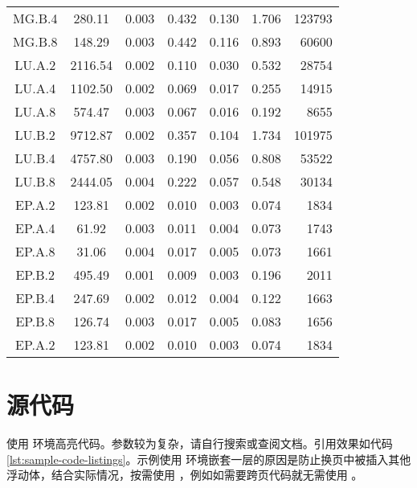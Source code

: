 \begin{longtable}[c]{ccccclr}
  MG.B.4 & 280.11 & 0.003 & 0.432 & 0.130 & 1.706 & 123793 \\
  MG.B.8 & 148.29 & 0.003 & 0.442 & 0.116 & 0.893 & 60600 \\
  LU.A.2 & 2116.54 & 0.002 & 0.110 & 0.030 & 0.532 & 28754 \\
  LU.A.4 & 1102.50 & 0.002 & 0.069 & 0.017 & 0.255 & 14915 \\
  LU.A.8 & 574.47 & 0.003 & 0.067 & 0.016 & 0.192 & 8655 \\
  LU.B.2 & 9712.87 & 0.002 & 0.357 & 0.104 & 1.734 & 101975 \\
  LU.B.4 & 4757.80 & 0.003 & 0.190 & 0.056 & 0.808 & 53522 \\
  LU.B.8 & 2444.05 & 0.004 & 0.222 & 0.057 & 0.548 & 30134 \\
  EP.A.2 & 123.81 & 0.002 & 0.010 & 0.003 & 0.074 & 1834 \\
  EP.A.4 & 61.92 & 0.003 & 0.011 & 0.004 & 0.073 & 1743 \\
  EP.A.8 & 31.06 & 0.004 & 0.017 & 0.005 & 0.073 & 1661 \\
  EP.B.2 & 495.49 & 0.001 & 0.009 & 0.003 & 0.196 & 2011 \\
  EP.B.4 & 247.69 & 0.002 & 0.012 & 0.004 & 0.122 & 1663 \\
  EP.B.8 & 126.74 & 0.003 & 0.017 & 0.005 & 0.083 & 1656 \\
  EP.A.2 & 123.81 & 0.002 & 0.010 & 0.003 & 0.074 & 1834 \\
  \bottomrule[1.5pt]
\end{longtable}


\section{源代码}


使用  环境高亮代码。参数较为复杂，请自行搜索或查阅文档。引用效果如代码 \ref{lst:sample-code-listings}。示例使用  环境嵌套一层的原因是防止换页中被插入其他浮动体，结合实际情况，按需使用 ，例如如需要跨页代码就无需使用 。


